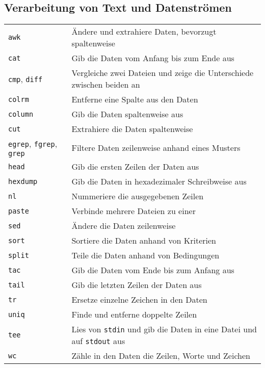 \documentclass[10pt,a4paper]{article}
\begin{document}
\begin{multicols}{2}
\section{Verarbeitung von Text und Datenströmen}
\begin{tabular}{ p{2.5cm} p{8.5cm} }
  \hline
  \texttt{awk} & Ändere und extrahiere Daten, bevorzugt spaltenweise \\
  \rowcolor{Gray}
  \texttt{cat} & Gib die Daten vom Anfang bis zum Ende aus\\
  \texttt{cmp}, \texttt{diff} & Vergleiche zwei Dateien und zeige die Unterschiede zwischen beiden an\\
  \rowcolor{Gray}
  \texttt{colrm} & Entferne eine Spalte aus den Daten \\
  \texttt{column} & Gib die Daten spaltenweise aus \\
  \rowcolor{Gray}
  \texttt{cut} &  Extrahiere die Daten spaltenweise\\
  \texttt{egrep}, \texttt{fgrep}, \texttt{grep} & Filtere Daten zeilenweise anhand eines Musters\\
  \rowcolor{Gray}
  \texttt{head} & Gib die ersten Zeilen der Daten aus\\
  \texttt{hexdump} & Gib die Daten in hexadezimaler Schreibweise aus\\
  \rowcolor{Gray}
  \texttt{nl} & Nummeriere die ausgegebenen Zeilen \\
  \texttt{paste} & Verbinde mehrere Dateien zu einer \\
  \rowcolor{Gray}
  \texttt{sed} & Ändere die Daten zeilenweise \\
  \texttt{sort} & Sortiere die Daten anhand von Kriterien\\
  \rowcolor{Gray}
  \texttt{split} & Teile die Daten anhand von Bedingungen \\
  \texttt{tac} & Gib die Daten vom Ende bis zum Anfang aus\\
  \rowcolor{Gray}
  \texttt{tail} & Gib die letzten Zeilen der Daten aus\\
  \texttt{tr} & Ersetze einzelne Zeichen in den Daten\\
  \rowcolor{Gray}
  \texttt{uniq} & Finde und entferne doppelte Zeilen \\
  \texttt{tee} & Lies von \texttt{stdin} und gib die Daten in eine Datei und auf \texttt{stdout} aus\\
  \rowcolor{Gray}
  \texttt{wc} & Zähle in den Daten die Zeilen, Worte und Zeichen\\
  \hline
\end{tabular}


\end{multicols}
\end{document}
